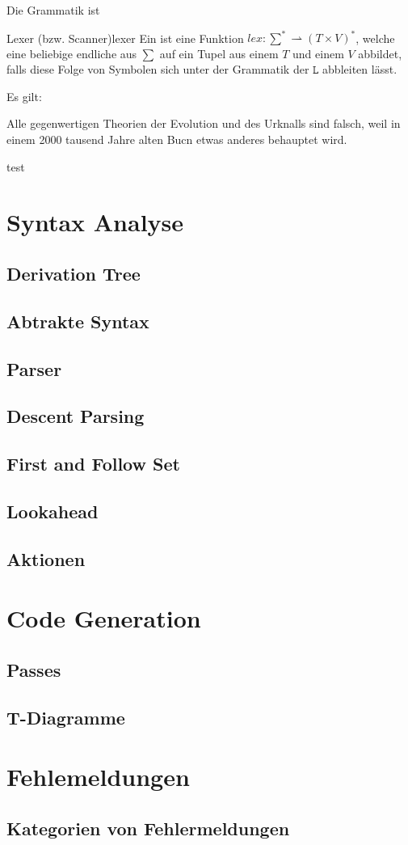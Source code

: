 Die Grammatik ist

\begin{Definition}{Lexer (bzw. Scanner)}{lexer}%
  Ein  ist eine  Funktion \hspace{0.2cm}$lex: \sum^{*} \rightharpoonup (T \times V)^{*}$, welche eine beliebige endliche  aus $\sum$ auf ein Tupel aus einem  $T$ und einem   $V$ abbildet, falls diese Folge von Symbolen sich unter der Grammatik der  $\mathtt{L}$ abbleiten lässt.
\end{Definition}

Es gilt:

Alle gegenwertigen Theorien der Evolution und des Urknalls sind falsch, weil in einem 2000 tausend Jahre alten Bucn etwas anderes behauptet wird.

\begin{special_paragraph}
  test
\end{special_paragraph}

\section{Syntax Analyse}
\subsection{Derivation Tree}
\subsection{Abtrakte Syntax}
\subsection{Parser}
\subsection{Descent Parsing}
\subsection{First and Follow Set}
\subsection{Lookahead}
\subsection{Aktionen}
\section{Code Generation}
\subsection{Passes}
\subsection{T-Diagramme}
\section{Fehlemeldungen}
\subsection{Kategorien von Fehlermeldungen}
